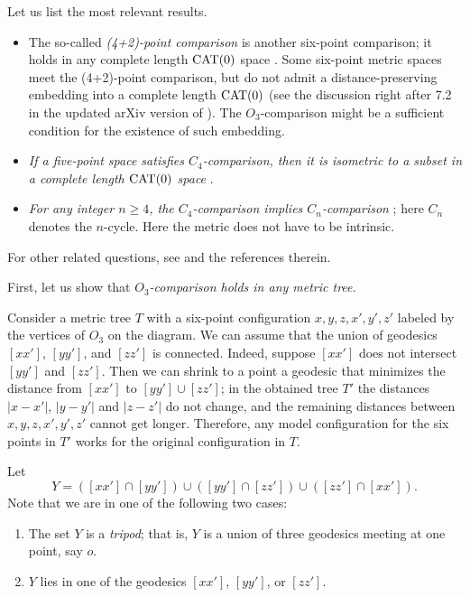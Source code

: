 \documentclass{article}
\begin{document}
Let us list the most relevant results.
\begin{itemize}
\item The so-called \emph{(4+2)-point comparison} is another six-point comparison;
it holds in any complete length $\mathrm{CAT}(0)$ space \cite{alexander-kapovitch-petrunin2011,alexander-kapovitch-petrunin2022}.
Some six-point metric spaces meet the (4+2)-point comparison, but do not admit a distance-preserving embedding into a complete length $\mathrm{CAT}(0)$
(see the discussion right after 7.2 in the updated arXiv version of \cite{alexander-kapovitch-petrunin2011}).
The $O_3$-comparison might be a sufficient condition for the existence of such embedding.

\item \textit{If a five-point space satisfies $C_4$-comparison, then it is isometric to a subset in a complete length $\mathrm{CAT}(0)$ space} \cite{toyoda2020,lebedeva-petrunin2021}.

\item \textit{For any integer $n\ge 4$, the $C_4$-comparison implies $C_n$-comparison} \cite{toyoda2023};
here $C_n$ denotes the $n$-cycle.
Here the metric does not have to be intrinsic. 
\end{itemize}
For other related questions, see \cite{gromov2001,gromov2007,petrunin2017,lebedeva,lebedeva-petrunin2010,lebedeva-petrunin2021,lebedeva-petrunin2022,lebedeva-petrunin2023,lebedeva-petrunin-zolotov, foertsch-lytchak-schroeder,eskenazis-mendel-naor,noar,toyoda2020,toyoda2023} and the references therein.

\bigskip

First, let us show that \textit{$O_3$-comparison holds in any metric tree.}

Consider a metric tree $T$ with a six-point configuration $x,y,z,x',y',z'$ labeled by the vertices of $O_3$ on the diagram.
We can assume that the union of geodesics $[xx']$, $[yy']$, and $[zz']$ is connected.
Indeed, suppose $[xx']$ does not intersect $[yy']$ and $[zz']$.
Then we can shrink to a point a geodesic that minimizes the distance from $[xx']$ to $[yy']\cup[zz']$;
in the obtained tree $T'$ the distances $|x-x'|$, $|y-y'|$ and $|z-z'|$ do not change, and the remaining distances between $x,y,z,x',y',z'$ cannot get longer.
Therefore, any model configuration for the six points in $T'$ works for the original configuration in $T$.

Let 
\[Y=([xx']\cap [yy'])\cup([yy']\cap [zz'])\cup([zz']\cap [xx']).\]
Note that we are in one of the following two cases:
\begin{enumerate}
\item The set $Y$ is a \emph{tripod}; that is, $Y$ is a union of three geodesics meeting at one point, say $o$.
\item $Y$ lies in one of the  geodesics $[xx']$, $[yy']$, or $[zz']$.
\end{enumerate}
\end{document}
